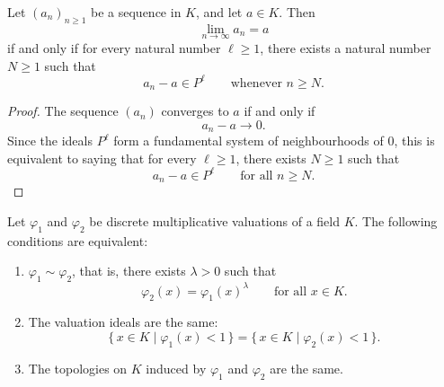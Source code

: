 \begin{corollary}
    Let \((a_n)_{n\geq 1}\) be a sequence in \(K\), and let \(a\in K\). Then
    \[
        \lim_{n\to\infty} a_n=a
    \]
    if and only if for every natural number \(\ell\geq 1\), there exists a natural
    number \(N\geq 1\) such that
    \[
        a_n-a\in P^\ell
        \qquad
        \text{whenever } n\geq N.
    \]
\end{corollary}

\begin{proof}
    The sequence \((a_n)\) converges to \(a\) if and only if
    \[
        a_n-a\longrightarrow 0.
    \]
    Since the ideals \(P^\ell\) form a fundamental system of neighbourhoods of
    \(0\), this is equivalent to saying that for every \(\ell\geq 1\), there exists
    \(N\geq 1\) such that
    \[
        a_n-a\in P^\ell
        \qquad
        \text{for all } n\geq N.
    \]
\end{proof}

\begin{lemma}
    Let \(\varphi_1\) and \(\varphi_2\) be discrete multiplicative valuations of a field
    \(K\). The following conditions are equivalent:
    \begin{enumerate}
        \item \(\varphi_1\sim \varphi_2\), that is, there exists \(\lambda>0\) such that
              \[
                  \varphi_2(x)=\varphi_1(x)^\lambda
                  \qquad
                  \text{for all }x\in K.
              \]
        \item The valuation ideals are the same:
              \[
                  \{\,x\in K\mid \varphi_1(x)<1\,\}
                  =
                  \{\,x\in K\mid \varphi_2(x)<1\,\}.
              \]
        \item The topologies on \(K\) induced by \(\varphi_1\) and \(\varphi_2\) are the same.
    \end{enumerate}
\end{lemma}

